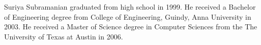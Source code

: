 \begin{vita}
Suriya Subramanian graduated from high school in 1999. He received a
Bachelor of Engineering degree from College of Engineering, Guindy, Anna
University in 2003. He received a Master of Science degree in Computer
Sciences from the The University of Texas at Austin in 2006.
\end{vita}
